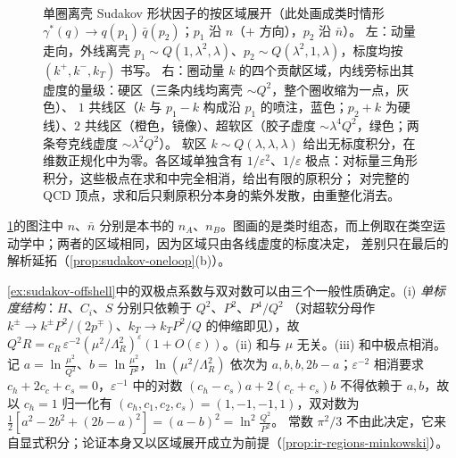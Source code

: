 \begin{figure}[htbp]
\caption{单圈离壳 Sudakov 形状因子的按区域展开（此处画成类时情形 $\gamma^*(q)\to q(p_1)\,\bar q(p_2)$；$p_1$ 沿 $n$（$+$ 方向），$p_2$ 沿 $\bar n$）。
左：动量走向，外线离壳 $p_1\sim Q(1,\lambda^2,\lambda)$、$p_2\sim Q(\lambda^2,1,\lambda)$，标度均按 $(k^+,k^-,k_T)$ 书写。
右：圈动量 $k$ 的四个贡献区域，内线旁标出其虚度的量级：硬区（三条内线均离壳 $\sim Q^2$，整个圈收缩为一点，灰色）、
$1$ 共线区（$k$ 与 $p_1-k$ 构成沿 $p_1$ 的喷注，蓝色；$p_2+k$ 为硬线）、$2$ 共线区（橙色，镜像）、超软区（胶子虚度 $\sim\lambda^4Q^2$，绿色；两条夸克线虚度 $\sim\lambda^2Q^2$）。
软区 $k\sim Q(\lambda,\lambda,\lambda)$ 给出无标度积分，在维数正规化中为零。各区域单独含有 $1/\varepsilon^2$、$1/\varepsilon$ 极点：对标量三角形积分，这些极点在求和中完全相消，给出有限的原积分；
对完整的 QCD 顶点，求和后只剩原积分本身的紫外发散，由重整化消去。}
\label{fig:sudakov-ff}
\end{figure}

\cref{fig:sudakov-ff}的图注中 $n$、$\bar n$ 分别是本书的 $n_A$、$n_B$。图画的是类时组态，而上例取在类空运动学中；两者的区域相同，因为区域只由各线虚度的标度决定，
差别只在最后的解析延拓（\cref{prop:sudakov-oneloop}(b)）。

\begin{remark}\label{rem:sudakov-consistency}
\cref{ex:sudakov-offshell}中的双极点系数与双对数可以由三个一般性质确定。(i) \emph{单标度结构}：$H$、$C_i$、$S$ 分别只依赖于 $Q^2$、$P^2$、$P^4/Q^2$
（对超软分母作 $k^\pm\to k^\pm P^2/(2p^\mp)$、$k_T\to k_TP^2/Q$ 的伸缩即见），故 $Q^2R=c_R\,\varepsilon^{-2}(\mu^2/\Lambda_R^2)^\varepsilon(1+O(\varepsilon))$。(ii) 和与 $\mu$ 无关。(iii) 和中极点相消。
记 $a=\ln\frac{\mu^2}{Q^2}$、$b=\ln\frac{\mu^2}{P^2}$，$\ln(\mu^2/\Lambda_R^2)$ 依次为 $a,b,b,2b-a$；$\varepsilon^{-2}$ 相消要求 $c_h+2c_c+c_s=0$，$\varepsilon^{-1}$ 中的对数 $(c_h-c_s)a+2(c_c+c_s)b$
不得依赖于 $a,b$，故以 $c_h=1$ 归一化有 $(c_h,c_1,c_2,c_s)=(1,-1,-1,1)$，双对数为 $\frac12[a^2-2b^2+(2b-a)^2]=(a-b)^2=\ln^2\frac{Q^2}{P^2}$。
常数 $\pi^2/3$ 不由此决定，它来自显式积分；论证本身又以区域展开成立为前提（\cref{prop:ir-regions-minkowski}）。
\end{remark}

